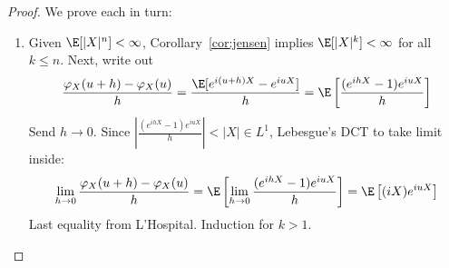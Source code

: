 \documentclass[12pt]{article}
\theoremstyle{plain}
\theoremstyle{definition}
\theoremstyle{remark}
\newcommand{\ra}{\rightarrow}
\begin{document}
\begin{proof}
We prove each in turn:
\begin{enumerate}[label=(\roman*)]
  \item
    Given $\E[|X|^n]<\infty$, Corollary~\ref{cor:jensen} implies
    $\E[|X|^k]<\infty$ for all $k\leq n$.
    Next, write out
    \begin{align*}
      \frac{\varphi_X(u+h)-\varphi_X(u)}{h}
      = \frac{\E[e^{i(u+h)X}-e^{iuX}]}{h}
      = \E\left[\frac{(e^{ihX}-1)e^{iuX}}{h}\right]
    \end{align*}
    Send $h\ra 0$.
    Since
    $\left\lvert\frac{(e^{ihX}-1)e^{iuX}}{h}\right\rvert<|X|\in L^1$,
    Lebesgue's DCT to take limit inside:
    \begin{align*}
      \lim_{h\ra 0}
      \frac{\varphi_X(u+h)-\varphi_X(u)}{h}
      =
      \E\left[
      \lim_{h\ra 0}
      \frac{(e^{ihX}-1)e^{iuX}}{h}
      \right]
      =
      \E\left[(iX)e^{iuX}\right]
    \end{align*}
    Last equality from L'Hospital. Induction for $k>1$.


\end{enumerate}
\end{proof}
\end{document}

